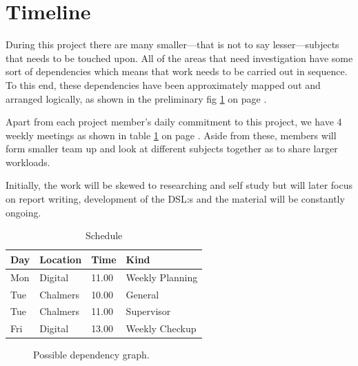 \section{Timeline}
During this project there are many smaller---that is not to say lesser---subjects that needs to be touched upon. All of the areas that need investigation have some sort of dependencies which means that work needs to be carried out in sequence. To this end, these dependencies have been approximately mapped out and arranged logically, as shown in the preliminary fig \ref{fig:dependency_graph} on page \pageref{fig:dependency_graph}.   

Apart from each project member's daily commitment to this project, we have 4 weekly meetings as shown in table \ref{tab:schedule} on page \pageref{tab:schedule}. Aside from these, members will form smaller team up and look at different subjects together as to share larger workloads.    

Initially, the work will be skewed to researching and self study but will later focus on report writing, development of the DSL:s and the material will be constantly ongoing.


\begin{table}
\caption{Schedule}
\label{tab:schedule}
\centering
\begin{tabular}{llll}
\hline
Day & Location & Time  & Kind            \\ \hline
Mon & Digital  & 11.00 & Weekly Planning \\
Tue & Chalmers & 10.00 & General         \\
Tue & Chalmers & 11.00 & Supervisor      \\
Fri & Digital  & 13.00 & Weekly Checkup 
\end{tabular}
\end{table}


\begin{figure}
  \caption{Possible dependency graph.}
  \label{fig:dependency_graph}
\end{figure}

